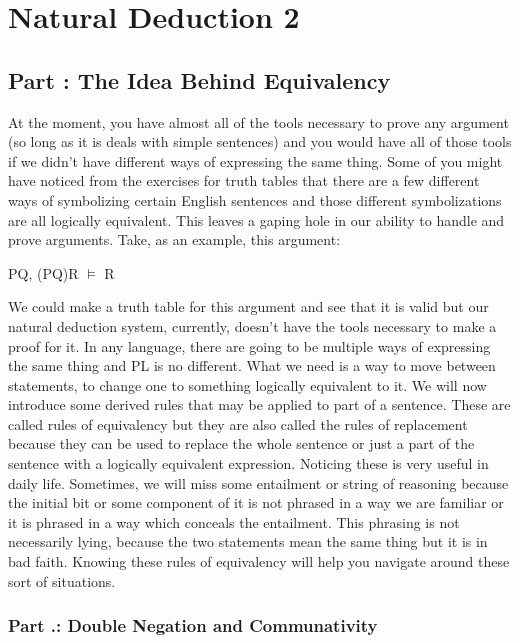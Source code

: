 \part{Natural Deduction 2}
\label{ch.plnd2}
\setcounter{seccount}{1}
\chapter{Part \thechapcount: The Idea Behind Equivalency}
At the moment, you have almost all of the tools necessary to prove any argument (so long as it is deals with simple sentences) and you would have all of those tools if we didn't have different ways of expressing the same thing. Some of you might have noticed from the exercises for truth tables that there are a few different ways of symbolizing certain English sentences and those different symbolizations are all logically equivalent. This leaves a gaping hole in our ability to handle and prove arguments. Take, as an example, this argument:
\begin{center}
\enot P\eor Q, (P\eif Q)\eif R $\vDash$ R
\end{center}
We could make a truth table for this argument and see that it is valid but our natural deduction system, currently, doesn't have the tools necessary to make a proof for it. In any language, there are going to be multiple ways of expressing the same thing and PL is no different. What we need is a way to move between statements, to change one to something logically equivalent to it. We will now introduce some derived rules that may be applied to part of a sentence. These are called rules of equivalency but they are also called the rules of replacement because they can be used to replace the whole sentence or just a part of the sentence with a logically equivalent expression. Noticing these is very useful in daily life. Sometimes, we will miss some entailment or string of reasoning because the initial bit or some component of it is not phrased in a way we are familiar or it is phrased in a way which conceals the entailment. This phrasing is not necessarily lying, because the two statements mean the same thing but it is in bad faith. Knowing these rules of equivalency will help you navigate around these sort of situations.  
\section{Part \thechapcount.\theseccount: Double Negation and Communativity}
